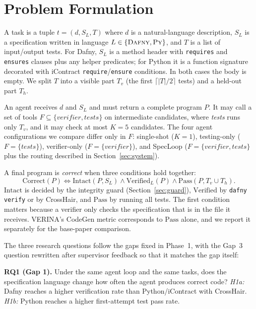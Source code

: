 \section{Problem Formulation}
\label{sec:problem}

A task is a tuple $t = (d, S_L, T)$ where $d$ is a natural-language description, $S_L$ is a specification written in language $L \in \{\textsc{Dafny}, \textsc{Py}\}$, and $T$ is a list of input/output tests. For Dafny, $S_L$ is a method header with \texttt{requires} and \texttt{ensures} clauses plus any helper predicates; for Python it is a function signature decorated with iContract \texttt{require}/\texttt{ensure} conditions. In both cases the body is empty. We split $T$ into a visible part $T_v$ (the first $\lceil |T|/2 \rceil$ tests) and a held-out part $T_h$.

An agent receives $d$ and $S_L$ and must return a complete program $P$. It may call a set of tools $F \subseteq \{\textit{verifier}, \textit{tests}\}$ on intermediate candidates, where \textit{tests} runs only $T_v$, and it may check at most $K = 5$ candidates. The four agent configurations we compare differ only in $F$: single-shot ($K = 1$), testing-only ($F = \{\textit{tests}\}$), verifier-only ($F = \{\textit{verifier}\}$), and SpecLoop ($F = \{\textit{verifier}, \textit{tests}\}$ plus the routing described in Section~\ref{sec:system}).

A final program is \emph{correct} when three conditions hold together:
\begin{equation}
\mathrm{Correct}(P) \iff \mathrm{Intact}(P, S_L) \land \mathrm{Verified}_L(P) \land \mathrm{Pass}(P, T_v \cup T_h).
\end{equation}
$\mathrm{Intact}$ is decided by the integrity guard (Section~\ref{sec:guard}), $\mathrm{Verified}$ by \texttt{dafny verify} or by CrossHair, and $\mathrm{Pass}$ by running all tests. The first condition matters because a verifier only checks the specification that is in the file it receives. VERINA's CodeGen metric corresponds to $\mathrm{Pass}$ alone, and we report it separately for the base-paper comparison.

The three research questions follow the gaps fixed in Phase~1, with the Gap~3 question rewritten after supervisor feedback so that it matches the gap itself:

\textbf{RQ1 (Gap 1).} Under the same agent loop and the same tasks, does the specification language change how often the agent produces correct code? \emph{H1a:} Dafny reaches a higher verification rate than Python/iContract with CrossHair. \emph{H1b:} Python reaches a higher first-attempt test pass rate.

